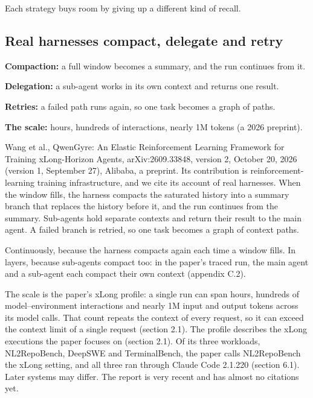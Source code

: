 \begin{takeaway}Each strategy buys room by giving up a different kind of recall.\end{takeaway}

\subsection{Real harnesses compact, delegate and retry}
\label{sec:it-7-5}

\bi
\item \textbf{Compaction:} a full window becomes a summary, and the run continues from it.
\item \textbf{Delegation:} a sub-agent works in its own context and returns one result.
\item \textbf{Retries:} a failed path runs again, so one task becomes a graph of paths.
\item \textbf{The scale:} hours, hundreds of interactions, nearly 1M tokens (a 2026 preprint).
\ei

Wang et al., QwenGyre: An Elastic Reinforcement Learning Framework for Training xLong-Horizon Agents, arXiv:2609.33848, version 2, October 20, 2026 (version 1, September 27), Alibaba, a preprint. Its contribution is reinforcement-learning training infrastructure, and we cite its account of real harnesses. When the window fills, the harness compacts the saturated history into a summary branch that replaces the history before it, and the run continues from the summary. Sub-agents hold separate contexts and return their result to the main agent. A failed branch is retried, so one task becomes a graph of context paths.

Continuously, because the harness compacts again each time a window fills. In layers, because sub-agents compact too: in the paper's traced run, the main agent and a sub-agent each compact their own context (appendix C.2).

The scale is the paper's xLong profile: a single run can span hours, hundreds of model--environment interactions and nearly 1M input and output tokens across its model calls. That count repeats the context of every request, so it can exceed the context limit of a single request (section 2.1). The profile describes the xLong executions the paper focuses on (section 2.1). Of its three workloads, NL2RepoBench, DeepSWE and TerminalBench, the paper calls NL2RepoBench the xLong setting, and all three ran through Claude Code 2.1.220 (section 6.1). Later systems may differ. The report is very recent and has almost no citations yet.

